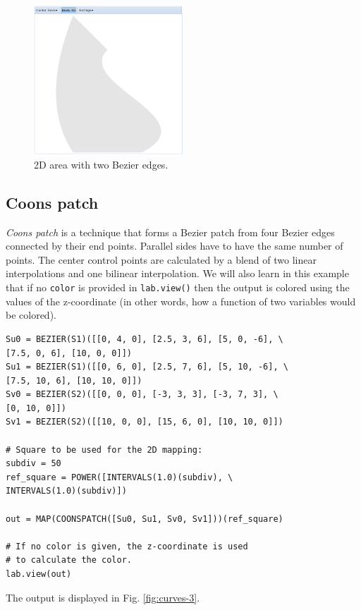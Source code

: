 \documentclass[article,A4,12pt]{llncs}
\begin{document}
\begin{figure}[!ht]
\begin{center}
\includegraphics[width=0.5\textwidth]{img/curves-2.png}
\end{center}
\vspace{-2mm}
\caption{2D area with two Bezier edges.}
\label{fig:curves-2}
\end{figure}


\subsection{Coons patch}

{\em Coons patch} is a technique that forms a Bezier patch from four Bezier edges connected 
by their end points. Parallel sides have to have the same number of points. The center control 
points are calculated by a blend of two linear interpolations and one bilinear interpolation.
We will also learn in this example that if no {\tt color} is provided in {\tt lab.view()}
then the output is colored using the values of the z-coordinate (in other words, how a function
of two variables would be colored).

\begin{verbatim}
Su0 = BEZIER(S1)([[0, 4, 0], [2.5, 3, 6], [5, 0, -6], \
[7.5, 0, 6], [10, 0, 0]])
Su1 = BEZIER(S1)([[0, 6, 0], [2.5, 7, 6], [5, 10, -6], \
[7.5, 10, 6], [10, 10, 0]])
Sv0 = BEZIER(S2)([[0, 0, 0], [-3, 3, 3], [-3, 7, 3], \
[0, 10, 0]])
Sv1 = BEZIER(S2)([[10, 0, 0], [15, 6, 0], [10, 10, 0]])

# Square to be used for the 2D mapping:
subdiv = 50
ref_square = POWER([INTERVALS(1.0)(subdiv), \
INTERVALS(1.0)(subdiv)])

out = MAP(COONSPATCH([Su0, Su1, Sv0, Sv1]))(ref_square)
	 
# If no color is given, the z-coordinate is used 
# to calculate the color. 
lab.view(out)
\end{verbatim}
The output is displayed in Fig. \ref{fig:curves-3}.
\end{document}
